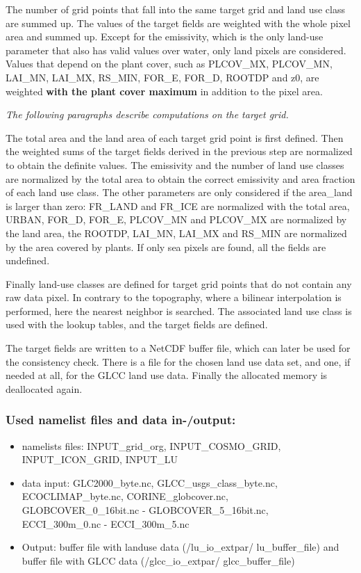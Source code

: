 \documentclass[a4paper,10pt,DIV14,BCOR1cm,titlepage,twoside]{scrartcl}
\begin{document}
\noindent The number of grid points that fall into the same target grid and land use class are summed up. The values of the target fields are weighted with the whole pixel area and summed up. Except for the emissivity, which is the only land-use parameter that also has valid values over water, only land pixels are considered. Values that depend on the plant cover, such as PLCOV\_MX, PLCOV\_MN, LAI\_MN, LAI\_MX, RS\_MIN, FOR\_E, FOR\_D, ROOTDP and z0, are weighted \textbf{with the plant cover maximum} in addition to the pixel area. \par\medskip\noindent
\textit{The following paragraphs describe computations on the target grid.}  \par\medskip\noindent
The total area and the land area of each target grid point is first defined. Then the weighted sums of the target fields derived in the previous step are normalized to obtain the definite values. The emissivity and the number of land use classes are normalized by the total area to obtain the correct emissivity and area fraction of each land use class. The other parameters are only considered if the area\_land is larger than zero: FR\_LAND and FR\_ICE are normalized with the total area, URBAN, FOR\_D, FOR\_E, PLCOV\_MN and PLCOV\_MX are normalized by the land area, the ROOTDP, LAI\_MN, LAI\_MX and RS\_MIN are normalized by the area covered by plants. If only sea pixels are found, all the fields are undefined.  \par\medskip\noindent
Finally land-use classes are defined for target grid points that do not contain any raw data pixel. In contrary to the topography, where a bilinear interpolation is performed, here the nearest neighbor is searched. The associated land use class is used with the lookup tables, and the target fields are defined.  \par\medskip\noindent
The target fields are written to a NetCDF buffer file, which can later be used for the consistency check. There is a file for the chosen land use data set, and one, if needed at all, for the GLCC land use data. Finally the allocated memory is deallocated again.  \par\medskip\noindent
\subsubsection{Used namelist files and data in-/output:}
\begin{itemize}
 \item namelists files: INPUT\_grid\_org, INPUT\_COSMO\_GRID, INPUT\_ICON\_GRID, INPUT\_LU 
 \item data input:  GLC2000\_byte.nc, GLCC\_usgs\_class\_byte.nc, \\
     ECOCLIMAP\_byte.nc, CORINE\_globcover.nc, \\ 
     GLOBCOVER\_0\_16bit.nc - GLOBCOVER\_5\_16bit.nc, \\
ECCI\_300m\_0.nc -  ECCI\_300m\_5.nc             
 \item Output: buffer file with landuse data (/lu\_io\_extpar/ lu\_buffer\_file) and buffer file with GLCC data (/glcc\_io\_extpar/ glcc\_buffer\_file)
\end{itemize}
\end{document}
